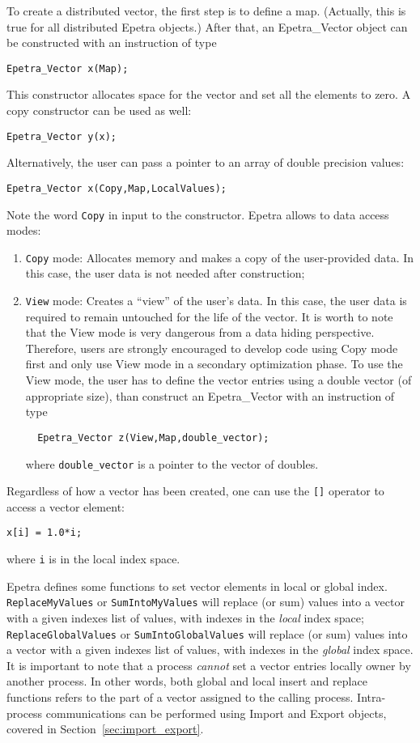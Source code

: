 To create a distributed vector, the first step is to define a map.
(Actually, this is true for all distributed Epetra objects.) After that,
an Epetra\_Vector object can be constructed with an instruction of type
\begin{verbatim}
Epetra_Vector x(Map);
\end{verbatim}
This constructor allocates space for the vector and set all the elements
to zero. A copy constructor can be used as well:
\begin{verbatim}
Epetra_Vector y(x);
\end{verbatim}
Alternatively, the user can pass a pointer to an array of double
precision values:
\begin{verbatim}
Epetra_Vector x(Copy,Map,LocalValues);
\end{verbatim}
Note the word \verb!Copy! in input to the constructor. Epetra allows to
data access modes:
\begin{enumerate}
\item \verb!Copy! mode: Allocates memory and makes a copy of the
  user-provided data. In this case, the user data is not needed after
  construction;
\item \verb!View! mode: Creates a ``view'' of the user's data. In this
  case, the user data is required to remain untouched for the life of the
  vector. It is worth to note that the View mode is very dangerous from
  a data hiding perspective. Therefore, users are strongly encouraged to
  develop code using Copy mode first and only use View mode in a
  secondary optimization phase. To use the View mode, the user has to
  define the vector entries using a double vector (of appropriate size),
  than construct an Epetra\_Vector with an instruction of type  
\begin{verbatim}
  Epetra_Vector z(View,Map,double_vector);
\end{verbatim}
  where \verb!double_vector! is a pointer to the vector of doubles.
\end{enumerate}

Regardless of how a vector has been created, one can use the \verb![]!
operator to access a vector element:
\begin{verbatim}
x[i] = 1.0*i;
\end{verbatim}
where \verb!i! is in the local index space. 

Epetra defines some functions to set vector elements in local or global
index.  \verb!ReplaceMyValues! or \verb!SumIntoMyValues! will replace
(or sum) values into a vector with a given indexes list of values, with
indexes in the {\em local} index space; \verb!ReplaceGlobalValues! or
\verb!SumIntoGlobalValues! will replace (or sum) values into a vector
with a given indexes list of values, with indexes in the {\em global}
index space. It is important to note that a process {\sl cannot} set a
vector entries locally owner by another process. In other words, both
global and local insert and replace functions refers to the part of a
vector assigned to the calling process. Intra-process communications can
be performed using Import and Export objects, covered in
Section~\ref{sec:import_export}.

